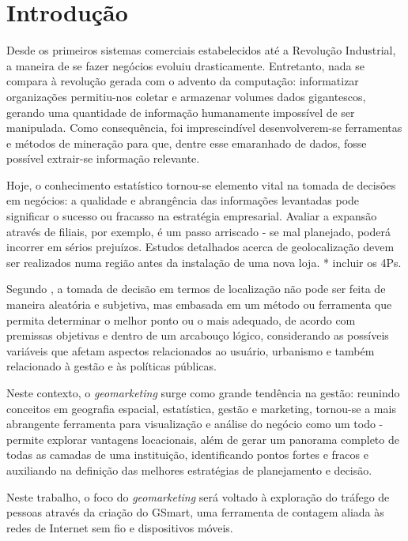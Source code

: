 ﻿
\chapter{Introdução}
\label{introducao}

Desde os primeiros sistemas comerciais estabelecidos até a Revolução Industrial,
a maneira de se fazer negócios evoluiu drasticamente. Entretanto, nada se
compara à revolução gerada com o advento da computação: informatizar
organizações permitiu-nos coletar e armazenar volumes dados
gigantescos, gerando uma quantidade de informação humanamente impossível de
ser manipulada. Como consequência, foi imprescindível desenvolverem-se ferramentas e
métodos de mineração para que, dentre esse emaranhado de dados, fosse possível extrair-se informação relevante. 

Hoje, o conhecimento estatístico tornou-se elemento vital na tomada de decisões em negócios: a qualidade e abrangência das informações levantadas pode significar o sucesso ou fracasso na estratégia empresarial. Avaliar a expansão através de filiais, por exemplo, é um passo arriscado - se mal planejado, poderá incorrer em sérios prejuízos. Estudos detalhados acerca de geolocalização devem ser realizados numa região antes da instalação de uma nova loja. * incluir os 4Ps. 

Segundo , a tomada de decisão em termos de
localização não pode ser feita de maneira aleatória e subjetiva, mas embasada em
um método ou ferramenta que permita determinar o melhor ponto ou o mais
adequado, de acordo com premissas objetivas e dentro de um arcabouço lógico,
considerando as possíveis variáveis que afetam aspectos relacionados ao usuário,
urbanismo e também relacionado à gestão e às políticas públicas. 

Neste contexto, o \emph{geomarketing} surge como grande tendência na gestão: reunindo conceitos em geografia espacial, estatística, gestão e marketing, tornou-se a mais abrangente ferramenta para visualização e análise do negócio como um todo - permite explorar vantagens locacionais, além de gerar um panorama completo de todas as camadas de uma instituição, identificando pontos fortes e fracos e auxiliando na definição das melhores estratégias de planejamento e decisão.

Neste trabalho, o foco do \emph{geomarketing} será voltado à exploração do tráfego
de pessoas através da criação do GSmart, uma ferramenta de contagem aliada às redes de
Internet sem fio e dispositivos móveis.

